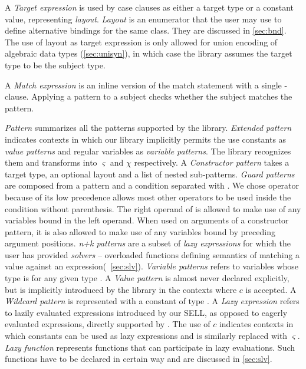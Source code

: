 A \emph{Target expression} is used by case clauses as either a target type or 
a constant value, representing \emph{layout}. \emph{Layout} is an enumerator 
that the user may use to define alternative bindings for the same class. They are 
discussed in \textsection\ref{sec:bnd}. The use of layout as target 
expression is only allowed for union encoding of algebraic data types 
(\textsection\ref{sec:unisyn}), in which case the library assumes the target 
type to be the subject type.

A \emph{Match expression} is an inline version of the match statement with 
a single -clause. Applying a pattern to a subject checks whether the 
subject matches the pattern.

\emph{Pattern} summarizes all the patterns supported by the library. 
\emph{Extended pattern} indicates contexts in which our library implicitly 
permits the use constants as \emph{value patterns} and regular \Cpp{} variables as 
\emph{variable patterns}. The library recognizes them and transforms into 
$\varsigma$ and $\chi$ respectively.
A \emph{Constructor pattern} takes a target type, an optional layout and a list of 
nested sub-patterns.
\emph{Guard patterns} are composed from a pattern and a condition separated with 
\code{|=}.
We chose operator \code{|=} because of its low precedence 
allows most other operators to be used inside the 
condition without parenthesis. The right operand of \code{|=} is allowed to make use of any 
variables bound in the left operand. When used on arguments of a constructor 
pattern, it is also allowed to make use of any variables bound by preceding 
argument positions. 
\emph{n+k patterns} are a subset of \emph{lazy expressions} for which the user has 
provided \emph{solvers} -- overloaded functions defining semantics of matching a 
value against an expression(\textsection~\ref{sec:slv}).
\emph{Variable patterns} refers to variables whose \Cpp{} type is  for 
any given type .
A \emph{Value pattern} is almost never declared explicitly, 
but is implicitly introduced by the library in the contexts where $c$ is 
accepted.
A \emph{Wildcard pattern} is represented with a constant of type 
.
A \emph{Lazy expression} refers to lazily evaluated expressions introduced by our SELL, 
as opposed to eagerly evaluated expressions, directly supported by \Cpp{}. The use 
of $c$ indicates contexts in which constants can be used as lazy expressions and 
is similarly replaced with $\varsigma$. \emph{Lazy function} represents 
functions that can participate in lazy evaluations. Such functions have to be 
declared in certain way and are discussed in \textsection\ref{sec:slv}. 

